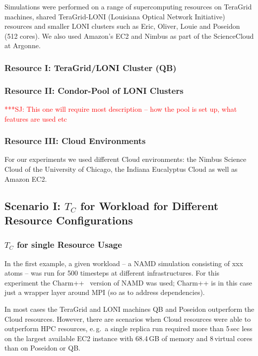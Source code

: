 \documentclass[conference,final]{IEEEtran}
\newcommand{\tc}{$T_{C}$ }
\newcommand{\jhanote}[1]{ {\textcolor{red} { ***SJ: #1 }}}
\newcommand{\jhanote}[1]{}
\begin{document}
Simulations were performed on a range of supercomputing resources on
TeraGrid machines, shared TeraGrid-LONI (Louisiana Optical Network
Initiative)~\cite{LONI_web} resources and smaller LONI clusters such
as Eric, Oliver, Louie and Poseidon (512 cores).  We also used
Amazon's EC2 and Nimbus as part of the ScienceCloud at Argonne.



\subsubsection*{Resource I: TeraGrid/LONI Cluster (QB)}

\subsubsection*{Resource II: Condor-Pool of LONI Clusters}

\jhanote{This one will require most description -- how the pool is set
up, what features are used etc}

\subsubsection*{Resource III: Cloud Environments}

For our experiments we used different Cloud environments: the Nimbus Science Cloud of the University of Chicago,
the Indiana Eucalyptus Cloud as well as Amazon EC2.


\subsection{Scenario I: \tc for Workload for Different Resource Configurations}

\subsubsection{\tc for single Resource Usage}

In the first example, a given workload -- a NAMD simulation consisting
of xxx atoms -- was run for 500 timesteps at different
infrastructures. For this experiment the Charm++~\cite{871085} version
of NAMD was used; Charm++ is in this case just a wrapper layer around
MPI (so as to address dependencies).

In most cases the TeraGrid and LONI machines QB and Poseidon
outperform the Cloud resources.  However, there are scenarios when
Cloud resources were able to outperform HPC resources, e.\,g.\ a
single replica run required more than 5\,sec less on the largest
available EC2 instance with 68.4\,GB of memory and 8\,virtual cores
than on Poseidon or QB.
\end{document}
